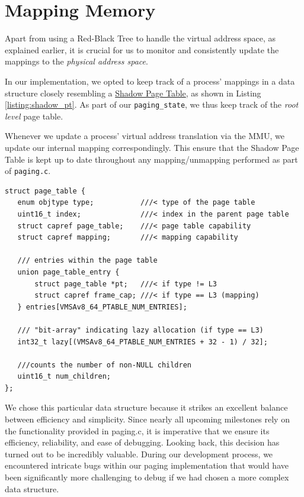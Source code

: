 \section{Mapping Memory}

Apart from using a Red-Black Tree to handle the virtual address space, as explained earlier, it is crucial for us to monitor and consistently update the mappings to the \emph{physical address space}.

In our implementation, we opted to keep track of a process' mappings in a data structure closely resembling a \href{https://en.wikipedia.org/wiki/Shadow_table}{Shadow Page Table}, as shown in Listing \ref{listing:shadow_pt}. As part of our \texttt{paging\_state}, we thus keep track of the \emph{root level} page table.

Whenever we update a process' virtual address translation via the MMU, we update our internal mapping correspondingly. This ensure that the Shadow Page Table is kept up to date throughout any mapping/unmapping performed as part of \texttt{paging.c}.

\begin{lstlisting}[caption={\texttt{page\_table}: Keeping Track of Memory Mappings},label={listing:shadow_pt}]
struct page_table {
   enum objtype type;           ///< type of the page table
   uint16_t index;              ///< index in the parent page table 
   struct capref page_table;    ///< page table capability
   struct capref mapping;       ///< mapping capability

   /// entries within the page table
   union page_table_entry {
       struct page_table *pt;   ///< if type != L3
       struct capref frame_cap; ///< if type == L3 (mapping)
   } entries[VMSAv8_64_PTABLE_NUM_ENTRIES];
   
   /// "bit-array" indicating lazy allocation (if type == L3)
   int32_t lazy[(VMSAv8_64_PTABLE_NUM_ENTRIES + 32 - 1) / 32];
   
   ///counts the number of non-NULL children
   uint16_t num_children;
};
\end{lstlisting}

We chose this particular data structure because it strikes an excellent balance between efficiency and simplicity. Since nearly all upcoming milestones rely on the functionality provided in paging.c, it is imperative that we ensure its efficiency, reliability, and ease of debugging. Looking back, this decision has turned out to be incredibly valuable. During our development process, we encountered intricate bugs within our paging implementation that would have been significantly more challenging to debug if we had chosen a more complex data structure.


